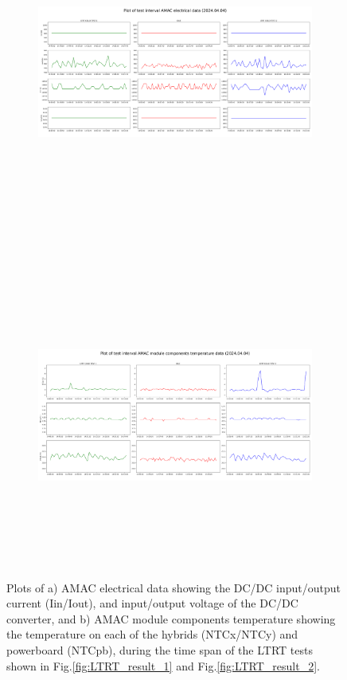 \begin{figure}[h]
    \begin{subfigure}[b]{1\textwidth}
        \centering
        \includegraphics[width=12cm,height=10cm,keepaspectratio]{Figures/results/amac_el_plot_20240404_.png}
        \caption{}
        \label{fig:amac_el}
    \end{subfigure}
    ~
    \begin{subfigure}[b]{1\textwidth}
        \centering
        \includegraphics[width=12cm,height=10cm,keepaspectratio]{Figures/results/amac_temp_plot_20240404_.png}
        \caption{}
        \label{fig:amac_temp}
    \end{subfigure}
    \caption{Plots of a) AMAC electrical data showing the DC/DC input/output current (Iin/Iout), and input/output voltage of the DC/DC converter, and b) AMAC module components temperature showing the temperature on each of the hybrids (NTCx/NTCy) and powerboard (NTCpb), during the time span of the LTRT tests shown in Fig.\ref{fig:LTRT_result_1} and Fig.\ref{fig:LTRT_result_2}.}
    
\end{figure}

